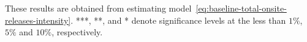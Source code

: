 \begin{table}[H]
{\begin{tabular}{@{}lllllllllllll@{}}
        \end{tabular}%
    }
    \begin{minipage}{18cm}
        \vspace{0.05in}
        These results are obtained from estimating model~\ref{eq:baseline-total-onsite-releases-intensity}. ***, **, and * denote significance levels at the less than $1\%$, $5\%$ and $10\%$, respectively.
    \end{minipage}
\end{table}